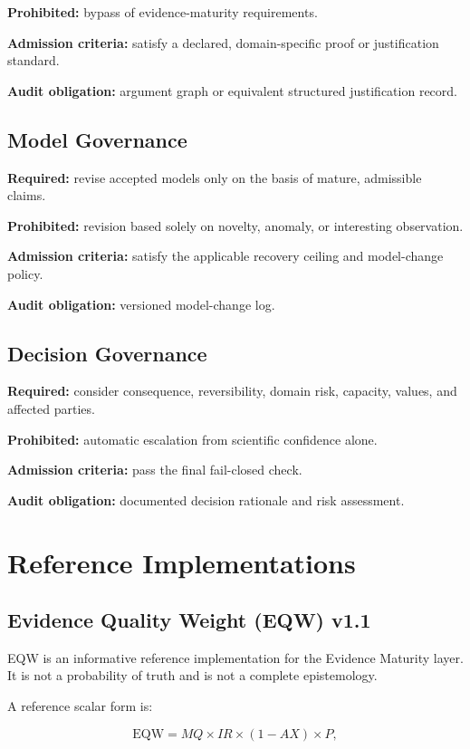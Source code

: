 \documentclass[11pt,a4paper]{article}
\begin{document}
\textbf{Prohibited:} bypass of evidence-maturity requirements.

\textbf{Admission criteria:} satisfy a declared, domain-specific proof or justification standard.

\textbf{Audit obligation:} argument graph or equivalent structured justification record.

\subsection{Model Governance}

\textbf{Required:} revise accepted models only on the basis of mature, admissible claims.

\textbf{Prohibited:} revision based solely on novelty, anomaly, or interesting observation.

\textbf{Admission criteria:} satisfy the applicable recovery ceiling and model-change policy.

\textbf{Audit obligation:} versioned model-change log.

\subsection{Decision Governance}

\textbf{Required:} consider consequence, reversibility, domain risk, capacity, values, and affected parties.

\textbf{Prohibited:} automatic escalation from scientific confidence alone.

\textbf{Admission criteria:} pass the final fail-closed check.

\textbf{Audit obligation:} documented decision rationale and risk assessment.

\section{Reference Implementations}

\subsection{Evidence Quality Weight (EQW) v1.1}

EQW is an informative reference implementation for the Evidence Maturity layer. It is not a probability of truth and is not a complete epistemology.

A reference scalar form is:

\begin{equation}
\mathrm{EQW} = MQ \times IR \times (1-AX) \times P,
\end{equation}
\end{document}
